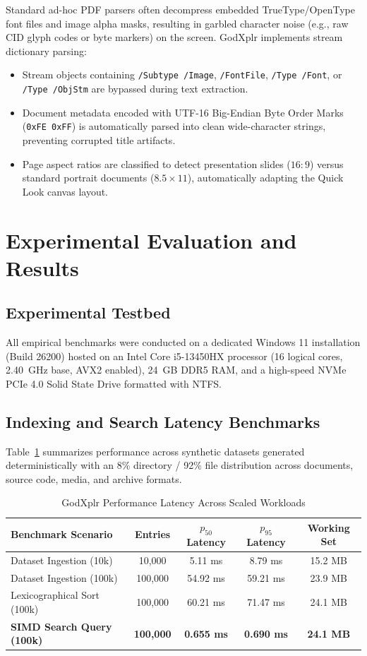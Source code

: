 \documentclass[conference]{IEEEtran}
\begin{document}
Standard ad-hoc PDF parsers often decompress embedded TrueType/OpenType font files and image alpha masks, resulting in garbled character noise (e.g., raw CID glyph codes or byte markers) on the screen. GodXplr implements stream dictionary parsing:
\begin{itemize}
    \item Stream objects containing \texttt{/Subtype /Image}, \texttt{/FontFile}, \texttt{/Type /Font}, or \texttt{/Type /ObjStm} are bypassed during text extraction.
    \item Document metadata encoded with UTF-16 Big-Endian Byte Order Marks (\texttt{0xFE 0xFF}) is automatically parsed into clean wide-character strings, preventing corrupted title artifacts.
    \item Page aspect ratios are classified to detect presentation slides ($16:9$) versus standard portrait documents ($8.5 \times 11$), automatically adapting the Quick Look canvas layout.
\end{itemize}

\section{Experimental Evaluation and Results}

\subsection{Experimental Testbed}
All empirical benchmarks were conducted on a dedicated Windows 11 installation (Build 26200) hosted on an Intel Core i5-13450HX processor (16 logical cores, 2.40~GHz base, AVX2 enabled), 24~GB DDR5 RAM, and a high-speed NVMe PCIe 4.0 Solid State Drive formatted with NTFS.

\subsection{Indexing and Search Latency Benchmarks}
Table~\ref{tab:benchmarks} summarizes performance across synthetic datasets generated deterministically with an 8\% directory / 92\% file distribution across documents, source code, media, and archive formats.

\begin{table}[htbp]
\caption{GodXplr Performance Latency Across Scaled Workloads}
\label{tab:benchmarks}
\centering
\begin{tabular}{lcccc}
\toprule
\textbf{Benchmark Scenario} & \textbf{Entries} & \textbf{$p_{50}$ Latency} & \textbf{$p_{95}$ Latency} & \textbf{Working Set} \\
\midrule
Dataset Ingestion (10k) & 10,000 & 5.11 ms & 8.79 ms & 15.2 MB \\
Dataset Ingestion (100k) & 100,000 & 54.92 ms & 59.21 ms & 23.9 MB \\
Lexicographical Sort (100k) & 100,000 & 60.21 ms & 71.47 ms & 24.1 MB \\
\textbf{SIMD Search Query (100k)} & \textbf{100,000} & \textbf{0.655 ms} & \textbf{0.690 ms} & \textbf{24.1 MB} \\
\bottomrule
\end{tabular}
\end{table}
\end{document}
